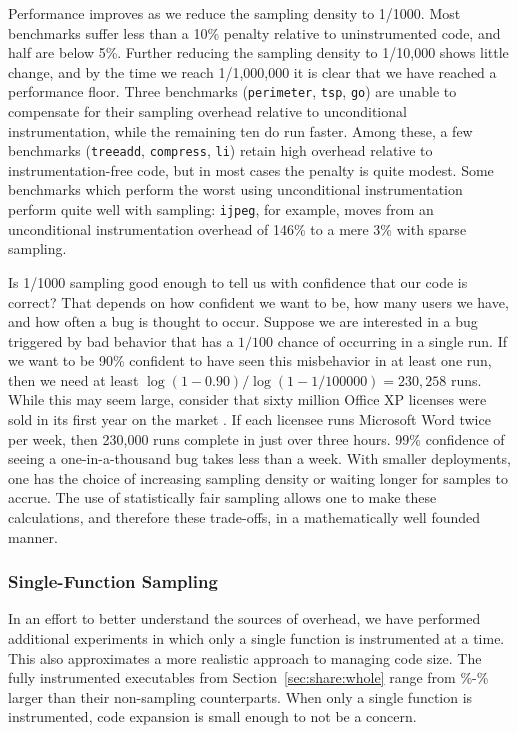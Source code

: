 Performance improves as we reduce the sampling density to 1/1000.
Most benchmarks suffer less than a 10\% penalty relative to
uninstrumented code, and half are below 5\%.  Further reducing the
sampling density to 1/10,000 shows little change, and by the time we
reach 1/1,000,000 it is clear that we have reached a performance
floor.  Three benchmarks (\texttt{perimeter}, \texttt{tsp},
\texttt{go}) are unable to compensate for their sampling overhead
relative to unconditional instrumentation, while the remaining ten do
run faster.  Among these, a few benchmarks (\texttt{treeadd},
\texttt{compress}, \texttt{li}) retain high overhead relative to
instrumentation-free code, but in most cases the penalty is quite
modest.  Some benchmarks which perform the worst using unconditional
instrumentation perform quite well with sampling: \texttt{ijpeg}, for
example, moves from an unconditional instrumentation overhead of 146\%
to a mere 3\% with sparse sampling.

Is 1/1000 sampling good enough to tell us with confidence that our
code is correct?  That depends on how confident we want to be, how
many users we have, and how often a bug is thought to occur.  Suppose
we are interested in a bug triggered by bad behavior that has a
$1/100$ chance of occurring in a single run.
If we want to be 90\% confident to have seen this misbehavior in at
least one run,
then we need at least $\log{(1-0.90)} / \log{( 1 - 1/100000)} =
230,258$ runs.
While this may
seem large, consider that sixty million Office XP licenses were sold
in its first year on the market \cite{Microsoft:2002:AR-F10K}.  If
each licensee runs Microsoft Word twice per week, then 230,000 runs
complete in just over three hours.  99\% confidence of seeing a
one-in-a-thousand bug takes less than a week.  With smaller
deployments, one has the choice of increasing sampling density or
waiting longer for samples to accrue.  The use of statistically fair
sampling allows one to make these calculations, and therefore these
trade-offs, in a mathematically well founded manner.

\subsubsection{Single-Function Sampling}
\label{sec:ccured:single}


In an effort to better understand the sources of overhead, we have
performed additional experiments in which only a single function is
instrumented at a time.  This also approximates a more realistic
approach to managing code size.  The fully instrumented executables
from Section~\ref{sec:share:whole} range from
\execGrowthMin\%-\execGrowthMax\% larger than their non-sampling
counterparts.  When only a single function is instrumented, code
expansion is small enough to not be a concern.

